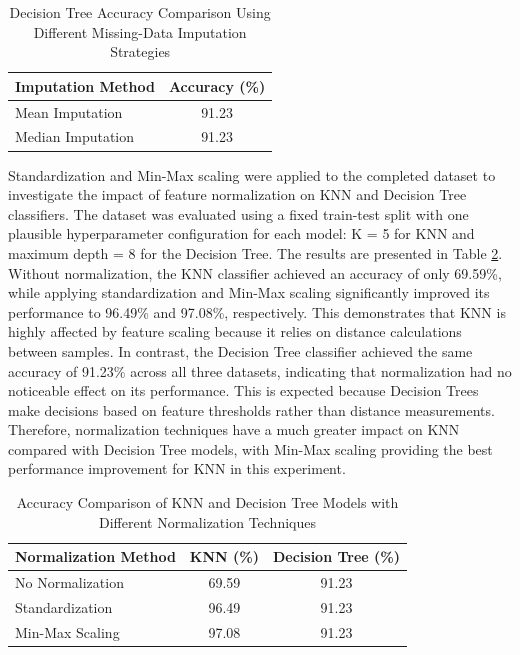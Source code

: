\documentclass[a4paper,12pt]{article}
\begin{document}
\begin{table}[h]
	\centering
	\begin{tabular}{lc}
		\hline
		\textbf{Imputation Method} & \textbf{Accuracy (\%)} \\
		\hline
		Mean Imputation & 91.23 \\
		Median Imputation & 91.23 \\
		\hline
	\end{tabular}
	\caption{Decision Tree Accuracy Comparison Using Different Missing-Data Imputation Strategies}
	\label{tab:decision_tree_imputation}
\end{table}

Standardization and Min-Max scaling were applied to the completed dataset to investigate the impact of feature normalization on KNN and Decision Tree classifiers. The dataset was evaluated using a fixed train-test split with one plausible hyperparameter configuration for each model: K = 5 for KNN and maximum depth = 8 for the Decision Tree. The results are presented in Table \ref{tab:normalization_comparison}. Without normalization, the KNN classifier achieved an accuracy of only 69.59\%, while applying standardization and Min-Max scaling significantly improved its performance to 96.49\% and 97.08\%, respectively. This demonstrates that KNN is highly affected by feature scaling because it relies on distance calculations between samples. In contrast, the Decision Tree classifier achieved the same accuracy of 91.23\% across all three datasets, indicating that normalization had no noticeable effect on its performance. This is expected because Decision Trees make decisions based on feature thresholds rather than distance measurements. Therefore, normalization techniques have a much greater impact on KNN compared with Decision Tree models, with Min-Max scaling providing the best performance improvement for KNN in this experiment.

\begin{table}[h]
	\centering
	\setlength{\tabcolsep}{4pt}
	\begin{tabular}{lcc}
		\hline
		\textbf{Normalization Method} & \textbf{KNN (\%)} & \textbf{Decision Tree (\%)} \\
		\hline
		No Normalization & 69.59 & 91.23 \\
		Standardization & 96.49 & 91.23 \\
		Min-Max Scaling & 97.08 & 91.23 \\
		\hline
	\end{tabular}
	\caption{Accuracy Comparison of KNN and Decision Tree Models with Different Normalization Techniques}
	\label{tab:normalization_comparison}
\end{table}
\end{document}
